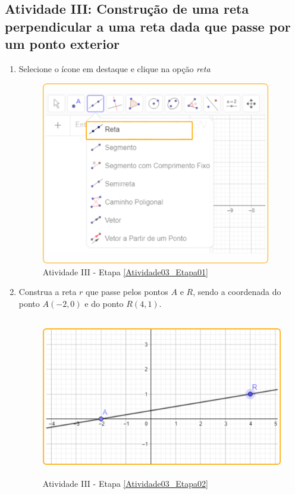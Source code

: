 \documentclass[11pt,a4paper]{article}
\begin{document}
\newpage

\subsection{Atividade III: Construção de uma reta perpendicular a uma reta dada que passe por um ponto exterior}

\begin{enumerate}[{Etapa} 1.]
\item Selecione o ícone em destaque e clique na opção {\it reta} \label{Atividade03_Etapa01}
\begin{figure}[H]
    \centering
    \includegraphics[height=8cm]{Figuras/T01_Elemento02.png}
    \caption{Atividade III - Etapa \ref{Atividade03_Etapa01}}
    \label{Atividade03_Etapa01_Imagem}
\end{figure}

\item Construa a reta $r$ que passe pelos pontos $A$ e $R$, sendo a coordenada do ponto $A (-2,0)$ e do ponto $R (4,1)$. \label{Atividade03_Etapa02}
\begin{figure}[H]
    \centering
    \includegraphics[height=7cm]{Figuras/T01_Atividade02_Fig01.png}
    \caption{Atividade III - Etapa \ref{Atividade03_Etapa02}}
    \label{Atividade03_Etapa02_Imagem}
\end{figure}


\end{enumerate}
\end{document}
